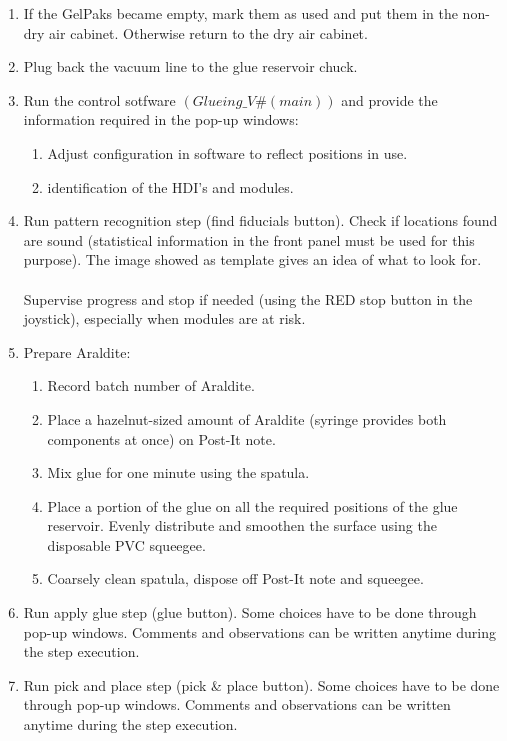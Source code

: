 \documentclass[12pt]{unlsilabsop}
\begin{document}
\begin{enumerate}
\begin{enumerate}
    \end{enumerate}
    \item If the GelPaks became empty, mark them as used and put them in the non-dry air cabinet. Otherwise return to the dry air cabinet.
    \item Plug back the vacuum line to the glue reservoir chuck.
    \item Run the control sotfware $(Glueing\_V\#(main))$ and provide the information required in the pop-up windows:
    \begin{enumerate}
        \item Adjust configuration in software to reflect positions in use.
        \item identification of the HDI's and modules.
    \end{enumerate}
    \item Run pattern recognition step (find fiducials button). Check if locations found are sound (statistical information in the front panel must be used for this purpose). The image showed as template gives an idea of what to look for. \\\\ 
      Supervise progress and stop if needed (using the RED stop button in the joystick), especially when modules are at risk.
    \item Prepare Araldite:
    \begin{enumerate}
        \item Record batch number of Araldite.
        \item Place a hazelnut-sized amount of Araldite (syringe provides both components at once) on Post-It note.
        \item Mix glue for one minute using the spatula.
        \item Place a portion of the glue on all the required positions of the glue reservoir. Evenly distribute and smoothen the surface using the disposable PVC squeegee.
        \item Coarsely clean spatula, dispose off Post-It note and squeegee.
    \end{enumerate}
    \item Run apply glue step (glue button). Some choices have to be done through pop-up windows. Comments and observations can be written anytime during the step execution.
    \item Run pick and place step (pick \& place button). Some choices have to be done through pop-up windows. Comments and observations can be written anytime during the step execution.

\end{enumerate}
\end{document}
